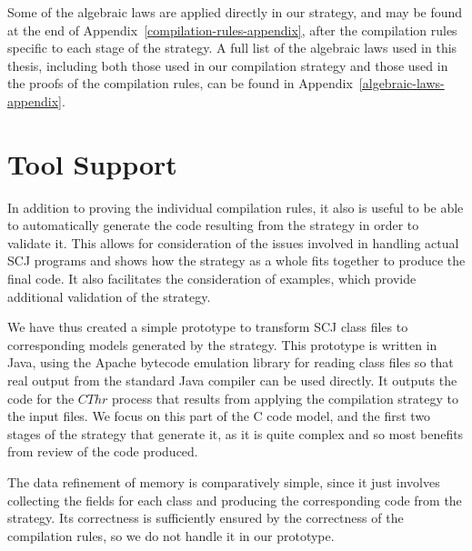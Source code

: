 Some of the algebraic laws are applied directly in our strategy, and
may be found at the end of Appendix~\ref{compilation-rules-appendix},
after the compilation rules specific to each stage of the strategy.
A full list of the algebraic laws used in this thesis, including both
those used in our compilation strategy and those used in the proofs of
the compilation rules, can be found in
Appendix~\ref{algebraic-laws-appendix}.


\section{Tool Support}
\label{tool-support-section}

In addition to proving the individual compilation rules, it also is
useful to be able to automatically generate the code resulting from
the strategy in order to validate it.
This allows for consideration of the issues involved in handling
actual SCJ programs and shows how the strategy as a whole fits
together to produce the final code.
It also facilitates the consideration of examples, which provide
additional validation of the strategy.

We have thus created a simple prototype to transform SCJ class files
to corresponding \Circus{} models generated by the strategy.
This prototype is written in Java, using the Apache bytecode emulation
library for reading class files so that real output from the standard
Java compiler can be used directly.
It outputs the \Circus{} code for the $CThr$ process that results from
applying the compilation strategy to the input files.
We focus on this part of the C code model, and the first two stages of
the strategy that generate it, as it is quite complex and so most
benefits from review of the code produced.

The data refinement of memory is comparatively simple, since it just
involves collecting the fields for each class and producing the
corresponding \Circus{} code from the strategy.
Its correctness is sufficiently ensured by the correctness of the
compilation rules, so we do not handle it in our prototype.

